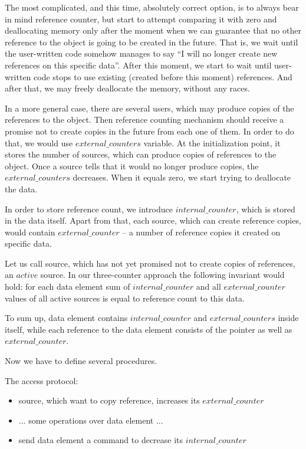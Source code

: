 \documentclass{article}
\begin{document}
The most complicated, and this time, absolutely correct option, is to always bear in mind reference counter, but start to attempt comparing it with zero and deallocating memory only after the moment when we can guarantee that no other reference to the object is going to be created in the future. That is, we wait until the user-written code somehow manages to say ``I will no longer create new references on this specific data''. After this moment, we start to wait until user-written code stops to use existing (created before this moment) references. And after that, we may freely deallocate the memory, without any races.

In a more general case, there are several users, which may produce copies of the references to the object. Then reference counting mechanism should receive a promise not to create copies in the future from each one of them. In order to do that, we would use $external\_counters$ variable. At the initialization point, it stores the number of sources, which can produce copies of references to the object. Once a source tells that it would no longer produce copies, the $external\_counters$ decreases. When it equals zero, we start trying to deallocate the data.

In order to store reference count, we introduce $internal\_counter$, which is stored in the data itself. Apart from that, each source, which can create reference copies, would contain $external\_counter$ -- a number of reference copies it created on specific data.

Let us call source, which has not yet promised not to create copies of references, an $active$ source. In our three-counter approach the following invariant would hold: for each data element sum of  $internal\_counter$ and all $external\_counter$ values of all active sources is equal to reference count to this data.

To sum up, data element contains $internal\_counter$ and $external\_counters$ inside itself, while each reference to the data element consists of the pointer as well as $external\_counter$.

Now we have to define several procedures.

The access protocol:
\begin{itemize}
	\item source, which want to copy reference, increases its $external\_counter$
	\item ... some operations over data element ...
	\item send data element a command to decrease its $internal\_counter$
\end{itemize}
\end{document}
